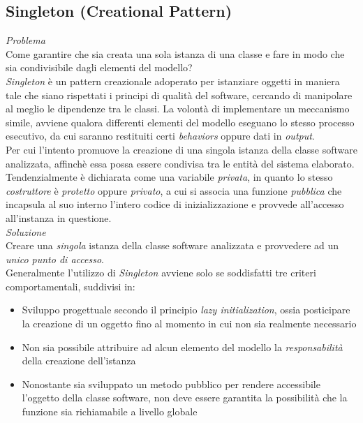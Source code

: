 \documentclass{article}
\begin{document}
\subsection*{Singleton (Creational Pattern)}
\large 
\textit{Problema}\\
Come garantire che sia creata una sola istanza di una classe e fare in modo che sia condivisibile dagli elementi del modello?\vspace*{14pt}\\
\textit{Singleton} è un pattern creazionale adoperato per istanziare oggetti in maniera tale che siano rispettati i principi di qualità del software, cercando di manipolare al meglio le dipendenze tra le classi. La volontà di implementare un meccanismo simile, avviene qualora differenti elementi del modello eseguano lo stesso processo esecutivo, da cui saranno restituiti certi \textit{behaviors} oppure dati in \textit{output}.\vspace*{14pt}\\
Per cui l'intento promuove la creazione di una singola istanza della classe software analizzata, affinchè essa possa essere condivisa tra le entità del sistema elaborato. Tendenzialmente è dichiarata come una variabile \textit{privata}, in quanto lo stesso \textit{costruttore} è \textit{protetto} oppure \textit{privato}, a cui si associa una funzione \textit{pubblica} che incapsula al suo interno l'intero codice di inizializzazione e provvede all'accesso all'instanza in questione.\vspace*{14pt}\\
\textit{Soluzione}\\
Creare una \textit{singola} istanza della classe software analizzata e provvedere ad un \textit{unico punto di accesso}.\vspace*{14pt}\\
Generalmente l'utilizzo di \textit{Singleton} avviene solo se soddisfatti tre criteri comportamentali, suddivisi in:
\begin{itemize}[label={-}]
    \itemsep0em
    \item Sviluppo progettuale secondo il principio \textit{lazy initialization}, ossia posticipare la creazione di un oggetto fino al momento in cui non sia realmente necessario 
    \item Non sia possibile attribuire ad alcun elemento del modello la \textit{responsabilità} della creazione dell'istanza
    \item Nonostante sia sviluppato un metodo pubblico per rendere accessibile l'oggetto della classe software, non deve essere garantita la possibilità che la funzione sia richiamabile a livello globale
\end{itemize}
\end{document}
